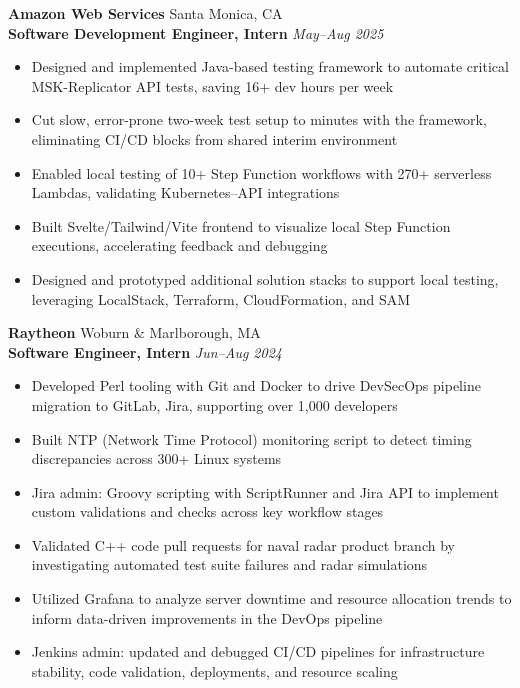 \documentclass[letterpaper,10pt]{article}
\newcommand{\company}[2]{
    \vspace{7pt}
    {\large \textbf{#1}}
    \hfill
    {\normalsize {#2}}
    \\
}
\newcommand{\position}[2]{
    \vspace{5pt}
    {\normalsize \textbf {#1}}
    \hfill
    {\normalsize \textit{#2}}
    \\
}
\newcommand{\itemsBegin}{
    \begin{itemize}[leftmargin=0.2in, labelsep=0.05in, itemsep=0pt, parsep=1pt, topsep=0pt, partopsep=0pt]
    \small
}
\newcommand{\itemsEnd}{\end{itemize}}
\begin{document}
    \company{Amazon Web Services}{Santa Monica, CA}
    \position{Software Development Engineer, Intern}{May--Aug 2025}
    \itemsBegin{}
        \item Designed and implemented Java-based testing framework to automate critical MSK-Replicator API tests, saving 16+ dev hours per week
        \item Cut slow, error-prone two-week test setup to minutes with the framework, eliminating CI/CD blocks from shared interim environment
        \item Enabled local testing of 10+ Step Function workflows with 270+ serverless Lambdas, validating Kubernetes--API integrations
        \item Built Svelte/Tailwind/Vite frontend to visualize local Step Function executions, accelerating feedback and debugging
        \item Designed and prototyped additional solution stacks to support local testing, leveraging LocalStack, Terraform, CloudFormation, and SAM
    \itemsEnd{}

    \company{Raytheon}{Woburn \& Marlborough, MA}

    \position{Software Engineer, Intern}{Jun--Aug 2024}
    \itemsBegin{}
        \item Developed Perl tooling with Git and Docker to drive DevSecOps pipeline migration to GitLab, Jira, supporting over 1,000 developers
        \item Built NTP (Network Time Protocol) monitoring script to detect timing discrepancies across 300+ Linux systems
        \item Jira admin: Groovy scripting with ScriptRunner and Jira API to implement custom validations and checks across key workflow stages
        \item Validated C++ code pull requests for naval radar product branch by investigating automated test suite failures and radar simulations
        \item Utilized Grafana to analyze server downtime and resource allocation trends to inform data-driven improvements in the DevOps pipeline
        \item Jenkins admin: updated and debugged CI/CD pipelines for infrastructure stability, code validation, deployments, and resource scaling
    \itemsEnd{}
\end{document}
